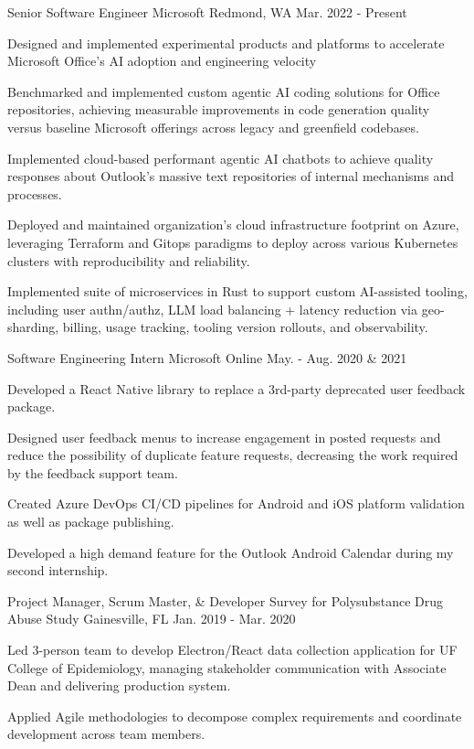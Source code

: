 \begin{cventries}
  \cventry
    {Senior Software Engineer}
    {Microsoft}
    {Redmond, WA}
    {Mar. 2022 - Present}
    {
      \begin{cvitems}
        \item{Designed and implemented experimental products and platforms to accelerate Microsoft Office's AI adoption and engineering velocity}
        \item{Benchmarked and implemented custom agentic AI coding solutions for Office repositories, achieving measurable improvements in code generation quality versus baseline Microsoft offerings across legacy and greenfield codebases.}
        \item{Implemented cloud-based performant agentic AI chatbots to achieve quality responses about Outlook's massive text repositories of internal mechanisms and processes.}
        \item{Deployed and maintained organization's cloud infrastructure footprint on Azure, leveraging Terraform and Gitops paradigms to deploy across various Kubernetes clusters with reproducibility and reliability.}
        \item{Implemented suite of microservices in Rust to support custom AI-assisted tooling, including user authn/authz, LLM load balancing + latency reduction via geo-sharding, billing, usage tracking, tooling version rollouts, and observability.}
      \end{cvitems}
    }
  \cventry
    {Software Engineering Intern}
    {Microsoft}
    {Online}
    {May. - Aug. 2020 \& 2021}
    {
      \begin{cvitems}
        \item{Developed a React Native library to replace a 3rd-party deprecated user feedback package.}
        \item{Designed user feedback menus to increase engagement in posted requests and reduce the possibility of duplicate feature requests, decreasing the work required by the feedback support team.}
        \item{Created Azure DevOps CI/CD pipelines for Android and iOS platform validation as well as package publishing.}
        \item{Developed a high demand feature for the Outlook Android Calendar during my second internship.}
      \end{cvitems}
    }
  \cventry
    {Project Manager, Scrum Master, \& Developer}
    {Survey for Polysubstance Drug Abuse Study}
    {Gainesville, FL}
    {Jan. 2019 - Mar. 2020}
    {
      \begin{cvitems}
        \item {Led 3-person team to develop Electron/React data collection application for UF College of Epidemiology, managing stakeholder communication with Associate Dean and delivering production system.}
        \item {Applied Agile methodologies to decompose complex requirements and coordinate development across team members.}
      \end{cvitems}
    }
\end{cventries}

